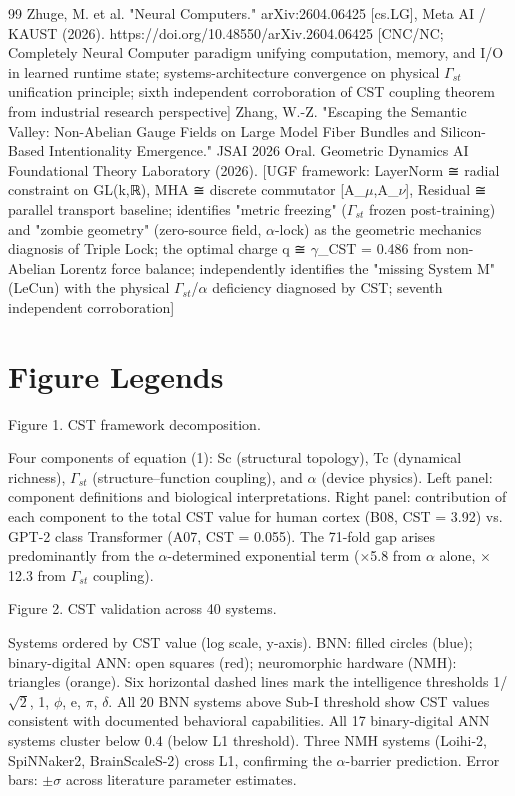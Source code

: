 \documentclass[a4paper,12pt]{article}
\begin{document}
\begin{thebibliography}{99}
 Zhuge, M. et al. "Neural Computers." arXiv:2604.06425 [cs.LG], Meta AI / KAUST (2026). https://doi.org/10.48550/arXiv.2604.06425 [CNC/NC; Completely Neural Computer paradigm unifying computation, memory, and I/O in learned runtime state; systems-architecture convergence on physical $\Gamma_{st}$ unification principle; sixth independent corroboration of CST coupling theorem from industrial research perspective]
 Zhang, W.-Z. "Escaping the Semantic Valley: Non-Abelian Gauge Fields on Large Model Fiber Bundles and Silicon-Based Intentionality Emergence." JSAI 2026 Oral.
Geometric Dynamics AI Foundational Theory Laboratory (2026). [UGF framework: LayerNorm ≅ radial constraint on GL(k,ℝ), MHA ≅ discrete commutator [A_$\mu$,A_$\nu$], Residual ≅ parallel transport baseline; identifies "metric freezing" ($\Gamma_{st}$ frozen post-training) and "zombie geometry" (zero-source field, $\alpha$-lock) as the geometric mechanics diagnosis of Triple Lock; the optimal charge q
≅ $\gamma$_CST = 0.486 from non-Abelian Lorentz force balance; independently identifies the "missing System M" (LeCun) with the physical $\Gamma_{st}$/$\alpha$ deficiency diagnosed by CST; seventh independent corroboration]
\end{thebibliography}

\section*{Figure Legends}
Figure 1. CST framework decomposition.

Four components of equation (1): Sc (structural topology), Tc (dynamical richness), $\Gamma_{st}$ (structure--function coupling), and $\alpha$ (device physics).
Left panel: component definitions and biological interpretations.
Right panel: contribution of each component to the total CST value for human cortex (B08, CST = 3.92) vs.
GPT-2 class Transformer (A07, CST = 0.055).
The 71-fold gap arises predominantly from the $\alpha$-determined exponential term ($\times$5.8 from $\alpha$ alone, $\times$12.3 from $\Gamma_{st}$ coupling).

Figure 2. CST validation across 40 systems.

Systems ordered by CST value (log scale, y-axis).
BNN: filled circles (blue); binary-digital ANN: open squares (red); neuromorphic hardware (NMH): triangles (orange).
Six horizontal dashed lines mark the intelligence thresholds {1/$\sqrt{2}$, 1, $\phi$, e, $\pi$, $\delta$}.
All 20 BNN systems above Sub-I threshold show CST values consistent with documented behavioral capabilities.
All 17 binary-digital ANN systems cluster below 0.4 (below L1 threshold).
Three NMH systems (Loihi-2, SpiNNaker2, BrainScaleS-2) cross L1, confirming the $\alpha$-barrier prediction.
Error bars: $\pm$$\sigma$ across literature parameter estimates.
\end{document}
